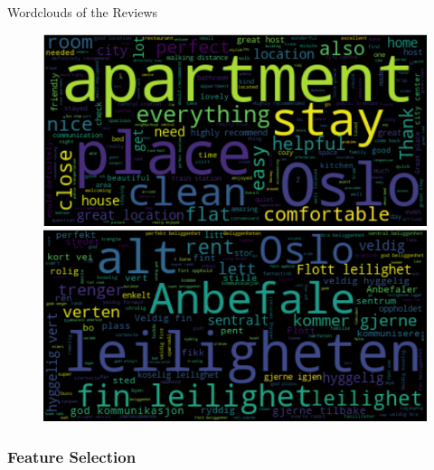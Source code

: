\documentclass[ngerman,inputenc]{beamer}
\begin{document}
\begin{frame}{Wordclouds of the Reviews}

  \begin{figure}[t]
    \centering
    \begin{minipage}{7cm}
      \includegraphics[width=\columnwidth]{wordcloud_eng.png}
    \end{minipage}
    \begin{minipage}{7cm}
      \includegraphics[width=\columnwidth]{wordcloud_nor.png}
    \end{minipage}
  \end{figure}

\end{frame}


\subsubsection{Feature Selection}
\end{document}
